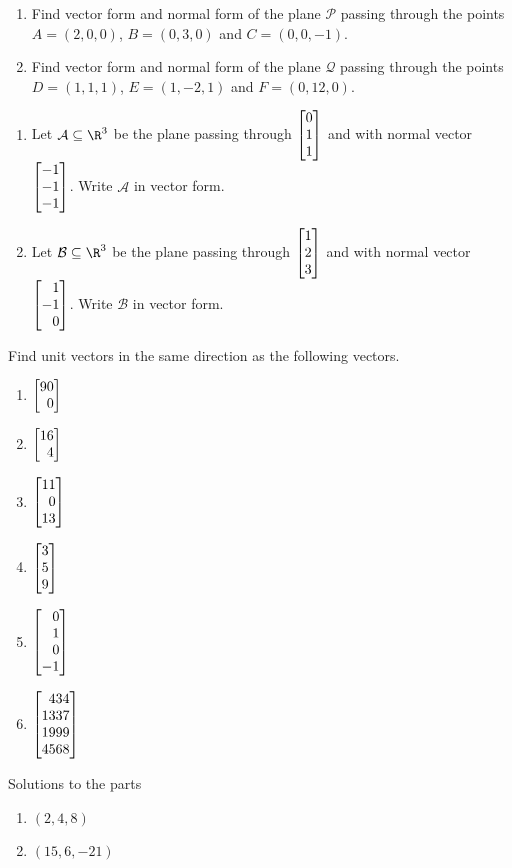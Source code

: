 \begin{exercises}
\begin{problist}
		\prob
		\begin{enumerate}
			\item Find vector form and normal form of the plane $\mathcal P$ passing
			through the points $A=(2,0,0)$, $B=(0,3,0)$ and $C=(0,0,-1)$.
			\item Find vector form and normal form of the plane $\mathcal Q$ passing
			through the points $D=(1,1,1)$, $E=(1,-2,1)$ and $F=(0,12,0)$.
		\end{enumerate}

		\prob
		\begin{enumerate}
			\item Let $\mathcal A\subseteq \R^3$ be the plane passing through $\mat{0\\1\\1}$
			and with normal vector $\mat{-1\\-1\\-1}$. Write $\mathcal A$ in vector form.
			\item Let $\mathcal B\subseteq \R^3$ be the plane passing through $\mat{1\\2\\3}$
			and with normal vector $\mat{1\\-1\\0}$. Write $\mathcal B$ in vector form.
		\end{enumerate}

		\prob Find unit vectors in the same direction as the following vectors.
		\begin{enumerate}
			\item $\mat{90\\0}$
			\item $\mat{16\\4}$
			\item $\mat{11\\0\\13}$
			\item $\mat{3\\5\\9}$
			\item $\mat{0\\1\\0\\-1}$
			\item $\mat{434\\1337\\1999\\4568}$
		\end{enumerate}

		\begin{solution}
		Solutions to the parts
			\begin{enumerate}
				\item   $(2,4,8)$
				\item   $(15,6,-21)$
			\end{enumerate}
		\end{solution}

	\end{problist}
\end{exercises}
